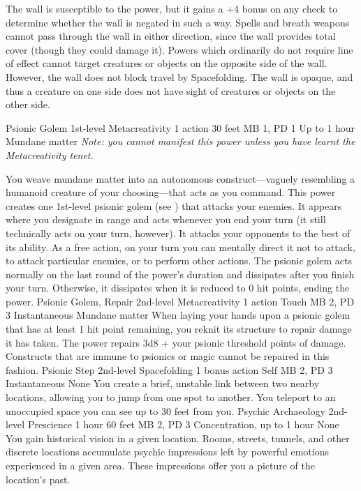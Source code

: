 The wall is susceptible to the  power,
but it gains a +4 bonus on any check to determine whether
the wall is negated in such a way. Spells and breath weapons
cannot pass through the wall in either direction, since the
wall provides total cover (though they could damage it). Powers
which ordinarily do not require line of effect cannot target
creatures or objects on the opposite side of the wall. However,
the wall does not block travel by Spacefolding. The wall is
opaque, and thus a creature on one side does not have sight
of creatures or objects on the other side.

\DndPowerHeader%
    {Psionic Golem\label{pwr:psionic_golem}}
    {1st-level Metacreativity}
    {1 action}
    {30 feet}
    {MB 1, PD 1}
    {Up to 1 hour}
    {Mundane matter}
\emph{Note: you cannot manifest this power
unless you have learnt the  Metacreativity tenet.}

You weave mundane matter into an autonomous construct---vaguely
resembling a humanoid creature of your choosing---that acts as you command.
This power creates one 1st-level psionic golem
(see )
that attacks your enemies. It appears where you designate
in range and acts whenever you end your turn (it still technically
acts on your turn, however). It attacks your opponents to
the best of its ability. As a free action, on your turn you can mentally
direct it not to attack, to attack particular enemies, or
to perform other actions. The psionic golem acts normally
on the last round of the power's duration and dissipates
after you finish your turn. Otherwise, it dissipates when
it is reduced to 0 hit points, ending the power.
\DndPowerHeader%
    {Psionic Golem, Repair\label{pwr:psionic_golem_repair}}
    {2nd-level Metacreativity}
    {1 action}
    {Touch}
    {MB 2, PD 3}
    {Instantaneous}
    {Mundane matter}
When laying your hands upon a psionic golem
that has at least 1 hit point remaining, you reknit its structure
to repair damage it has taken. The power repairs 3d8 + your psionic
threshold points of damage. Constructs that
are immune to psionics or magic cannot be repaired in this
fashion.
\DndPowerHeader%
    {Psionic Step\label{pwr:psionic_step}}
    {2nd-level Spacefolding}
    {1 bonus action}
    {Self}
    {MB 2, PD 3}
    {Instantaneous}
    {None}
You create a brief, unstable link between
two nearby locations, allowing you to jump from one spot to
another. You teleport to an unoccupied space you can see up
to 30 feet from you.
\DndPowerHeader%
    {Psychic Archaeology\label{pwr:psychic_archaeology}}
    {2nd-level Prescience}
    {1 hour}
    {60 feet}
    {MB 2, PD 3}
    {Concentration, up to 1 hour}
    {None}
You gain historical vision in a given location.
Rooms, streets, tunnels, and other discrete locations accumulate
psychic impressions left by powerful emotions experienced
in a given area. These impressions offer you a picture of
the location's past.

